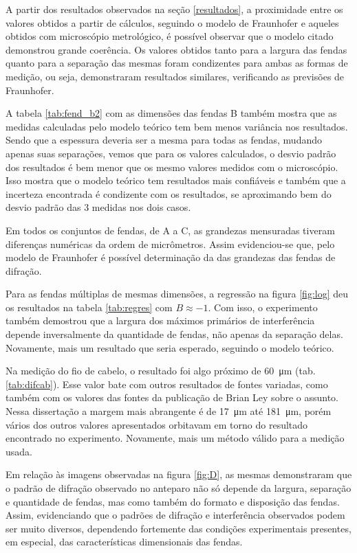 A partir dos resultados observados na seção \ref{resultados}, a proximidade entre os valores obtidos a partir de cálculos, seguindo o modelo de Fraunhofer e aqueles obtidos com microscópio metrológico, é possível observar que o modelo citado demonstrou grande coerência. Os valores obtidos tanto para a largura das fendas quanto para a separação das mesmas foram condizentes para ambas as formas de medição, ou seja, demonstraram resultados similares, verificando as previsões de Fraunhofer.

A tabela \ref{tab:fend_b2} com as dimensões das fendas B também mostra que as medidas calculadas pelo modelo teórico tem bem menos variância nos resultados. Sendo que a espessura deveria ser a mesma para todas as fendas, mudando apenas suas separações, vemos que para os valores calculados, o desvio padrão dos resultados é bem menor que os mesmo valores medidos com o microscópio. Isso mostra que o modelo teórico tem resultados mais confiáveis e também que a incerteza encontrada é condizente com os resultados, se aproximando bem do desvio padrão das 3 medidas nos dois casos.

Em todos os conjuntos de fendas, de A a C, as grandezas mensuradas tiveram diferenças numéricas da ordem de micrômetros. Assim evidenciou-se que, pelo modelo de Fraunhofer é possível determinação da das grandezas das fendas de difração.

Para as fendas múltiplas de mesmas dimensões, a regressão na figura \ref{fig:log} deu os resultados na tabela \ref{tab:regres} com $B \approx -1$. Com isso, o experimento também demostrou que a largura dos máximos primários de interferência depende inversalmente da quantidade de fendas, não apenas da separação delas. Novamente, mais um resultado que seria esperado, seguindo o modelo teórico.

Na medição do fio de cabelo, o resultado foi algo próximo de \SI{60}{\micro\meter} (tab. \ref{tab:difcab}). Esse valor bate com outros resultados de fontes variadas, como também com os valores das fontes da publicação\cite{ref:cabelo} de Brian Ley sobre o assunto. Nessa dissertação a margem mais abrangente é de \SI{17}{\micro\meter} até \SI{181}{\micro\meter}, porém vários dos outros valores apresentados orbitavam em torno do resultado encontrado no experimento. Novamente, mais um método válido para a medição usada.

Em relação às imagens observadas na figura \ref{fig:D}, as mesmas demonstraram que o padrão de difração observado no anteparo não só depende da largura, separação e quantidade de fendas, mas como também do formato e disposição das fendas. Assim, evidenciando que o padrões de difração e interferência observados podem ser muito diversos, dependendo fortemente das condições experimentais presentes, em especial, das características dimensionais das fendas.
